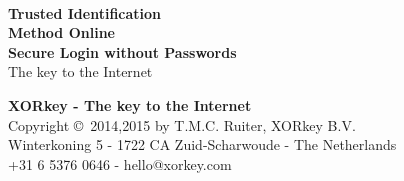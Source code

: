 


\raggedbottom
\begin{titlepage}
\begin{center}
\hspace*{2.5cm}
\newline
\dashes
\vspace*{1.0cm}
\sffamily
\Huge
\textbf{\textcolor{darkxor}{\TIMO}}\\
\textbf{\textcolor{darkxor}{Trusted Identification}}\\
\textbf{\textcolor{darkxor}{Method Online}}\\
\vspace{5mm}
\Large
\textbf{\textcolor{darkxor}{Secure Login without Passwords}}\\
\vspace{20mm}
\hspace*{2.7cm}
\newline
\normalsize
\textcolor{darkxor}{The key to the Internet}
\end{center}
\end{titlepage}
\newpage
\thispagestyle{empty}
\vspace*{6.00cm}
\dashes
\begin{center}
\vspace*{-.5em}
\textbf{XORkey - The key to the Internet}\\
\vspace{1em}
\small
Copyright \copyright\ 2014,2015 by T.M.C. Ruiter, XORkey B.V.\\
Winterkoning 5 - 1722 CA Zuid-Scharwoude - The Netherlands\\
+31 6 5376 0646 - hello@xorkey.com 
\normalsize
\end{center}
\newpage

